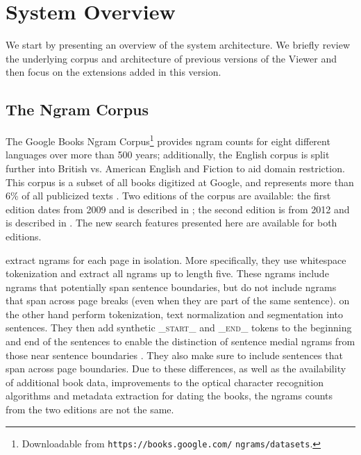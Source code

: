 \documentclass[11pt,a4paper]{article}
\begin{document}
\section{System Overview}
\label{sec:overview}

We start by presenting an overview of the system architecture. We briefly review the underlying corpus and architecture of previous versions of the Viewer \cite{culturomics,lin2012syntactic} and then focus on the extensions added in this version.


\subsection{The Ngram Corpus}
	The Google Books Ngram Corpus\footnote{Downloadable from \texttt{https://books.google.com/} \texttt{ngrams/datasets}.} provides ngram counts for eight different languages over more than 500 years; additionally, the English corpus is split further into British vs. American English and Fiction to aid domain restriction. This corpus is a subset of all books digitized at Google, and represents more than 6\% of all publicized texts \cite{lin2012syntactic}. Two editions of the corpus are available: the first edition dates from 2009 and is described in ; the second edition is from 2012 and is described in . The new search features presented here are available for both editions.

 extract ngrams for each page in isolation. More specifically, they use whitespace tokenization and extract all ngrams up to length five. These ngrams include ngrams that potentially span sentence boundaries, but do not include ngrams that span across page breaks (even when they are part of the same sentence).
 on the other hand perform tokenization, text normalization and segmentation into sentences. They then add synthetic \textsf{\textsc{\_start\_}} and \textsf{\textsc{\_end\_}} tokens to the beginning and end of the sentences to enable the distinction of sentence medial ngrams from those near sentence boundaries \cite{lin2012syntactic}. They also make sure to include sentences that span across page boundaries. Due to these differences, as well as the availability of additional book data, improvements to the optical character recognition algorithms and metadata extraction for dating the books, the ngrams counts from the two editions are not the same.
\end{document}
